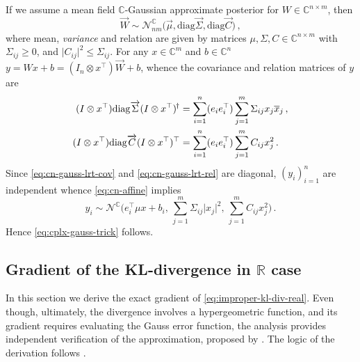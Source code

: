 \documentclass[a4paper,10pt]{article}
\newcommand{\real}{\mathbb{R}}
\newcommand{\cplx}{\mathbb{C}}
\newcommand{\hop}{{\mkern-1.5mu\dagger}}
\newcommand{\conj}[1]{\overline{#1}}
\renewcommand{\vec}[1]{\overrightarrow{#1}}
\newcommand{\diag}[1]{\mathrm{diag}{#1}}
\begin{document}
If we assume a mean field $\cplx$-Gaussian approximate posterior for $
  W \in \cplx^{n\times m}
$, then
\begin{equation}  \label{eq:c-gauss-vi-general-vec}
  \vec{W}
    \sim \mathcal{N}^{\cplx}_{nm} \bigl(
      \vec{\mu}, \diag{\vec{\Sigma}}, \diag{\vec{C}}
    \bigr)
  \,,
\end{equation}
where mean, \textit{variance} and relation are given by matrices $
  \mu, \Sigma, C \in \cplx^{n\times m}
$ with $\Sigma_{ij} \geq 0$, and $
  \lvert C_{ij} \rvert^2 \leq \Sigma_{ij}
$. For any $x \in \cplx^m$ and $b\in \cplx^n$ $
  y = W x + b
    = (I_n \otimes x^\top) \vec{W} + b
$, whence the covariance and relation matrices of $y$ are
\begin{align}
  (I \otimes x^\top) \diag{\vec{\Sigma}} (I \otimes x^\top)^{\hop}
    & = \sum_{i=1}^n (e_i e_i^\top) \sum_{j=1}^m \Sigma_{ij} x_j \conj{x}_j
    \,,  \label{eq:cn-gauss-lrt-cov} \\
  (I \otimes x^\top) \diag{\vec{C}} (I \otimes x^\top)^\top
    & = \sum_{i=1}^n (e_i e_i^\top) \sum_{j=1}^m C_{ij} x_j^2
    \,.  \label{eq:cn-gauss-lrt-rel}
\end{align}
Since \eqref{eq:cn-gauss-lrt-cov} and \eqref{eq:cn-gauss-lrt-rel} are diagonal, $(y_i)_{i=1}^n$
are independent whence \eqref{eq:cn-affine} implies
\begin{equation}  \label{eq:cplx-gauss-trick-appendix}
  y_i
    \sim \mathcal{N}^{\cplx}
      \bigl(
        e_i^\top \mu x + b_i,
        \, \sum_{j=1}^m \Sigma_{ij} \lvert x_j \rvert^2,
        \, \sum_{j=1}^m C_{ij} x_j^2
      \bigr)
    \,.
\end{equation}
Hence \eqref{eq:cplx-gauss-trick} follows.


\subsection{Gradient of the KL-divergence in $\real$ case} %
\label{sub:real-chisq-grad}  %

In this section we derive the exact gradient of \eqref{eq:improper-kl-div-real}. Even
though, ultimately, the divergence involves a hypergeometric function, and its gradient
requires evaluating the Gauss error function, the analysis provides independent verification
of the approximation, proposed by \citet{molchanov_variational_2017}. The logic of the
derivation follows \citet{lapidoth_capacity_2003}.
\end{document}
